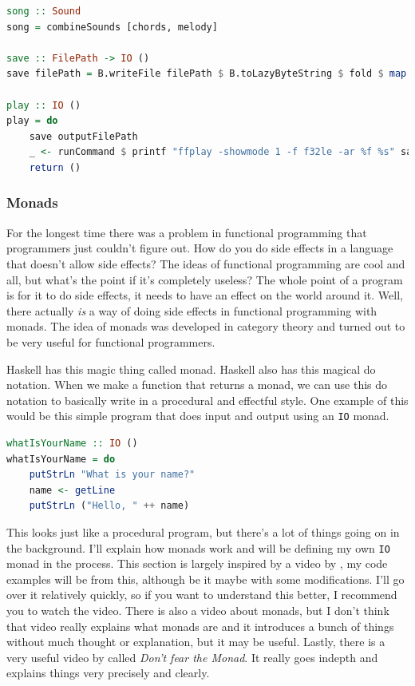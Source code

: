 \documentclass[11pt]{article}
\begin{document}
\begin{lstlisting}[language=Haskell, basicstyle=\tiny]
song :: Sound
song = combineSounds [chords, melody]

save :: FilePath -> IO ()
save filePath = B.writeFile filePath $ B.toLazyByteString $ fold $ map B.floatLE song

play :: IO ()
play = do
    save outputFilePath
    _ <- runCommand $ printf "ffplay -showmode 1 -f f32le -ar %f %s" sampleRate outputFilePath
    return ()
\end{lstlisting}

\subsubsection{Monads}\label{monads}

For the longest time there was a problem in functional programming that
programmers just couldn't figure out. How do you do side effects in a language
that doesn't allow side effects? The ideas of functional programming are cool
and all, but what's the point if it's completely useless? The whole point of a
program is for it to do side effects, it needs to have an effect on the world
around it. Well, there actually \emph{is} a way of doing side effects in
functional programming with monads. The idea of monads was developed in
category theory and turned out to be very useful for functional programmers.

Haskell has this magic thing called monad. Haskell also has this magical do
notation. When we make a function that returns a monad, we can use this do
notation to basically write in a procedural and effectful style. One example of
this would be this simple program that does input and output using an
\texttt{IO} monad.

\begin{lstlisting}[language=Haskell]
whatIsYourName :: IO ()
whatIsYourName = do
    putStrLn "What is your name?"
    name <- getLine
    putStrLn ("Hello, " ++ name)
\end{lstlisting}

This looks just like a procedural program, but there's a lot of things going on
in the background. I'll explain how monads work and will be defining my own
\texttt{IO} monad in the process. This section is largely inspired by a video
by \textcite{tsmonad}, my code examples will be from this, although be it maybe
with some modifications. I'll go over it relatively quickly, so if you want to
understand this better, I recommend you to watch the video. There is also a
\textcite{cpmonad} video about monads, but I don't think that video really
explains what monads are and it introduces a bunch of things without much
thought or explanation, but it may be useful. Lastly, there is a very useful
video by \textcite{beckman2012} called \emph{Don't fear the Monad}. It really
goes indepth and explains things very precisely and clearly.
\end{document}
